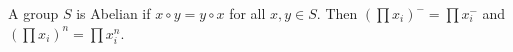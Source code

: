 A group $S$ is Abelian if $x \circ y = y \circ x$ for all $x, y \in S$. Then $(\prod x_i)^{-} = \prod x_i^{-}$ and $(\prod x_i)^n = \prod x_i^n$.
